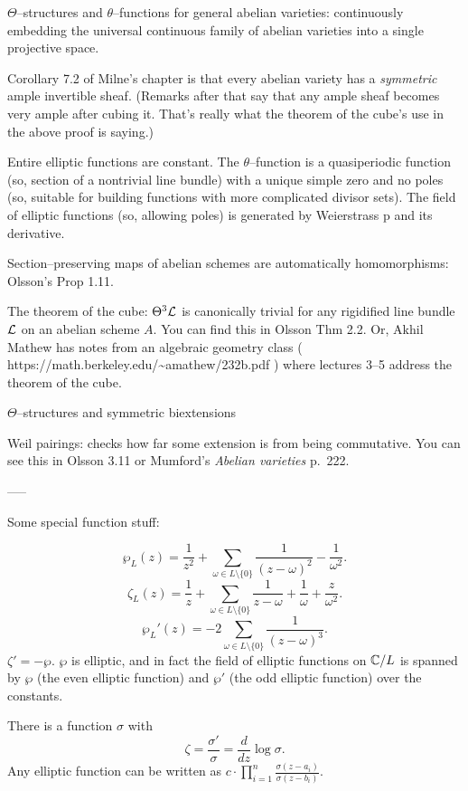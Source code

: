 $\Theta$--structures and $\theta$--functions for general abelian varieties: continuously embedding the universal continuous family of abelian varieties into a single projective space.

Corollary 7.2 of Milne's chapter is that every abelian variety has a \emph{symmetric} ample invertible sheaf.  (Remarks after that say that any ample sheaf becomes very ample after cubing it. That's really what the theorem of the cube's use in the above proof is saying.)

Entire elliptic functions are constant.  The $\theta$--function is a quasiperiodic function (so, section of a nontrivial line bundle) with a unique simple zero and no poles (so, suitable for building functions with more complicated divisor sets).  The field of elliptic functions (so, allowing poles) is generated by Weierstrass p and its derivative.


Section--preserving maps of abelian schemes are automatically homomorphisms: Olsson's Prop 1.11.

The theorem of the cube: $\Theta^3 \mathcal{L}$ is canonically trivial for any rigidified line bundle $\mathcal{L}$ on an abelian scheme $A$.  You can find this in Olsson Thm 2.2.  Or, Akhil Mathew has notes from an algebraic geometry class ( https://math.berkeley.edu/{\textasciitilde}amathew/232b.pdf ) where lectures 3--5 address the theorem of the cube.

$\Theta$--structures and symmetric biextensions

Weil pairings: checks how far some extension is from being commutative. You can see this in Olsson 3.11 or Mumford's \textit{Abelian varieties} p.\ 222.

-----

Some special function stuff:

\[\wp_L(z) = \frac{1}{z^2} + \sum_{\omega \in L \setminus \{0\}} \frac{1}{(z - \omega)^2} - \frac{1}{\omega^2}.\]
\[\zeta_L(z) = \frac{1}{z} + \sum_{\omega \in L \setminus \{0\}} \frac{1}{z - \omega} + \frac{1}{\omega} + \frac{z}{\omega^2}.\]
\[\wp_L'(z) = -2 \sum_{\omega \in L \setminus \{0\}} \frac{1}{(z - \omega)^3}.\]
$\zeta' = -\wp$.  $\wp$ is elliptic, and in fact the field of elliptic functions on $\mathbb{C} / L$ is spanned by $\wp$ (the even elliptic function) and $\wp'$ (the odd elliptic function) over the constants.

There is a function $\sigma$ with \[\zeta = \frac{\sigma'}{\sigma} = \frac{d}{dz} \log \sigma.\]  Any elliptic function can be written as $c \cdot \prod_{i=1}^n \frac{\sigma(z - a_i)}{\sigma(z - b_i)}$.

